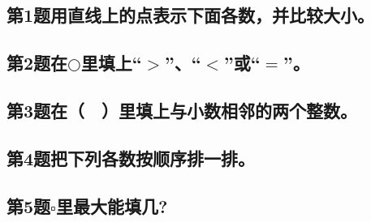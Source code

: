 \subsection*{第1题\quad 用直线上的点表示下面各数，并比较大小。}
\subsection*{第2题\quad 在$\bigcirc$里填上“$>$”、“$<$”或“$=$”。}
\subsection*{第3题\quad 在（　）里填上与小数相邻的两个整数。}
\subsection*{第4题\quad 把下列各数按顺序排一排。}
\subsection*{第5题\quad $\square$里最大能填几?}
